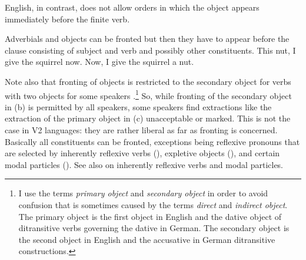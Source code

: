 English, in contrast, does not allow orders in which the object appears immediately before the
finite verb.

\eal
{}
\zl 
Adverbials and objects can be fronted but then they have to appear before the clause consisting of
subject and verb and possibly other constituents.
\eal
\ex This nut, I give the squirrel now. 
\ex Now, I give the squirrel a nut.
\zl

Note also that fronting of objects is restricted to the secondary object for verbs with two objects
for some speakers \citep[]{Hudson92a-u}.\footnote{
  I use the terms \emph{primary object} and \emph{secondary object} in order to avoid confusion that is sometimes
  caused by the terms \emph{direct} and \emph{indirect object}. The primary object is the first object in English
  and the dative object of ditransitive verbs governing the dative in German. The secondary object
  is the second object in English and the accusative in German ditransitive constructions.
} So, while fronting of the secondary object in
(b) is permitted by all speakers, some speakers find extractions like the extraction of the
primary object in (c) unacceptable or marked.
\vspace{-\baselineskip}
\eal
\judgewidth{\%}
\zl
This is not the case in V2 languages: they are rather liberal as far as fronting
is concerned. Basically all constituents can be fronted, exceptions being reflexive
pronouns that are selected by inherently reflexive verbs (), expletive objects (), and certain modal
particles (). See also  on inherently reflexive verbs and modal particles.
\eal
{}
\zl
\eal
{}
\zl
\eal
{}
\zl

